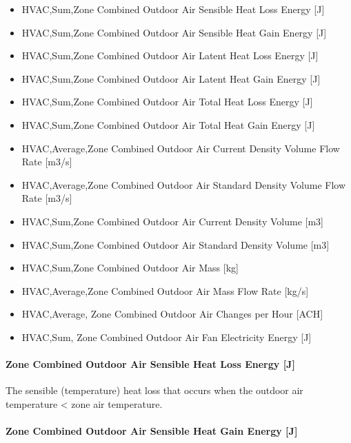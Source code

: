 \begin{itemize}
\item
  HVAC,Sum,Zone Combined Outdoor Air Sensible Heat Loss Energy {[}J{]}
\item
  HVAC,Sum,Zone Combined Outdoor Air Sensible Heat Gain Energy {[}J{]}
\item
  HVAC,Sum,Zone Combined Outdoor Air Latent Heat Loss Energy {[}J{]}
\item
  HVAC,Sum,Zone Combined Outdoor Air Latent Heat Gain Energy {[}J{]}
\item
  HVAC,Sum,Zone Combined Outdoor Air Total Heat Loss Energy {[}J{]}
\item
  HVAC,Sum,Zone Combined Outdoor Air Total Heat Gain Energy {[}J{]}
\item
  HVAC,Average,Zone Combined Outdoor Air Current Density Volume Flow Rate {[}m3/s{]}
\item
  HVAC,Average,Zone Combined Outdoor Air Standard Density Volume Flow Rate {[}m3/s{]}
\item
  HVAC,Sum,Zone Combined Outdoor Air Current Density Volume {[}m3{]}
\item
  HVAC,Sum,Zone Combined Outdoor Air Standard Density Volume {[}m3{]}
\item
  HVAC,Sum,Zone Combined Outdoor Air Mass {[}kg{]}
\item
  HVAC,Average,Zone Combined Outdoor Air Mass Flow Rate {[}kg/s{]}
\item
  HVAC,Average, Zone Combined Outdoor Air Changes per Hour {[}ACH{]}
\item
  HVAC,Sum, Zone Combined Outdoor Air Fan Electricity Energy {[}J{]}
\end{itemize}

\paragraph{Zone Combined Outdoor Air Sensible Heat Loss Energy {[}J{]}}\label{zone-combined-outdoor-air-sensible-heat-loss-energy-j}

The sensible (temperature) heat loss that occurs when the outdoor air temperature \textless{} zone air temperature.

\paragraph{Zone Combined Outdoor Air Sensible Heat Gain Energy {[}J{]}}\label{zone-combined-outdoor-air-sensible-heat-gain-energy-j}

